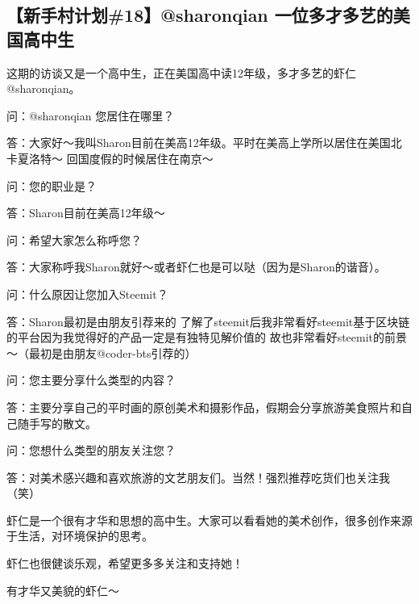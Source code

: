 \documentclass[]{ctexbook}
\begin{document}
\hypertarget{18sharonqian-}{%
\subsection{【新手村计划\#18】@sharonqian 一位多才多艺的美国高中生}\label{18sharonqian-}}

这期的访谈又是一个高中生，正在美国高中读12年级，多才多艺的虾仁 @sharonqian。

问：@sharonqian 您居住在哪里？

答：大家好～我叫Sharon目前在美高12年级。平时在美高上学所以居住在美国北卡夏洛特～ 回国度假的时候居住在南京～

问：您的职业是？

答：Sharon目前在美高12年级～

问：希望大家怎么称呼您？

答：大家称呼我Sharon就好～或者虾仁也是可以哒（因为是Sharon的谐音）。

问：什么原因让您加入Steemit？

答：Sharon最初是由朋友引荐来的 了解了steemit后我非常看好steemit基于区块链的平台因为我觉得好的产品一定是有独特见解价值的 故也非常看好steemit的前景～（最初是由朋友@coder-bts引荐的）

问：您主要分享什么类型的内容？

答：主要分享自己的平时画的原创美术和摄影作品，假期会分享旅游美食照片和自己随手写的散文。

问：您想什么类型的朋友关注您？

答：对美术感兴趣和喜欢旅游的文艺朋友们。当然！强烈推荐吃货们也关注我（笑）

虾仁是一个很有才华和思想的高中生。大家可以看看她的美术创作，很多创作来源于生活，对环境保护的思考。

虾仁也很健谈乐观，希望更多多关注和支持她！

有才华又美貌的虾仁～
\end{document}
